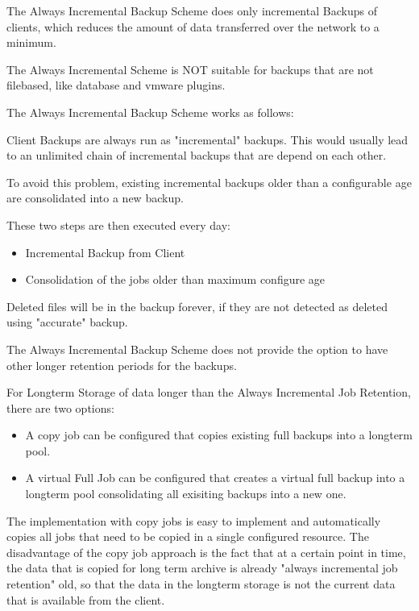 The Always Incremental Backup Scheme does only incremental Backups of clients, which reduces the amount of data transferred over the network to a minimum.


The Always Incremental Scheme is NOT suitable for backups that are not filebased, like database and vmware plugins.

The Always Incremental Backup Scheme works as follows:

Client Backups are always run as "incremental" backups. This would usually lead to an unlimited chain of incremental backups that are depend on each other.

To avoid this problem, existing incremental backups older than a configurable age are consolidated into a new backup.


These two steps are then executed every day:

\begin{itemize}
    \item Incremental Backup from Client
    \item Consolidation of the jobs older than maximum configure age
\end{itemize}

Deleted files will be in the backup forever, if they are not detected as deleted using "accurate" backup.

The Always Incremental Backup Scheme does not provide the option to have other longer retention
periods for the backups.

For Longterm Storage of data longer than the Always Incremental Job Retention, there are two options:

\begin{itemize}
    \item A copy job can be configured that copies existing full backups into a longterm pool.
    \item A virtual Full Job can be configured that creates a virtual full backup into a longterm pool consolidating all exisiting backups into a new one.
\end{itemize}

The implementation with copy jobs is easy to implement and automatically copies all jobs that need to be copied in a single configured resource.
The disadvantage of the copy job approach is the fact that at a certain point in time, the data that is copied for long term archive is already "always incremental job retention" old, so that the data in the longterm storage is not the current data that is available from the client.

